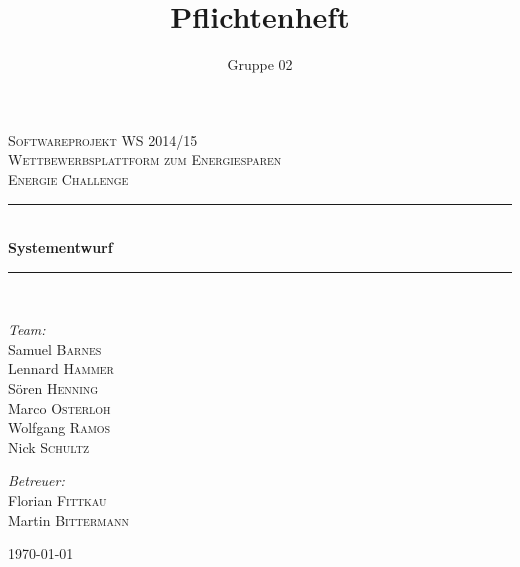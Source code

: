 \documentclass[10pt,a4paper]{article}
\author{Gruppe 02}
\title{Pflichtenheft}
\begin{document}
\begin{titlepage}

\begin{center}



\textsc{\LARGE Softwareprojekt WS 2014/15}\\[1.5cm]

\textsc{\Large Wettbewerbsplattform zum Energiesparen\\[1cm]Energie Challenge}\\[0.5cm]


\newcommand{\HRule}{\rule{\linewidth}{0.5mm}}
\HRule \\[0.4cm]
{ \huge \bfseries Systementwurf}\\[0.4cm]

\HRule \\[1.5cm]

\begin{minipage}{0.4\textwidth}
\begin{flushleft} \large
\emph{Team:}\\
Samuel \textsc{Barnes}\\
Lennard \textsc{Hammer}\\
S\"oren \textsc{Henning}\\
Marco \textsc{Osterloh}\\
Wolfgang \textsc{Ramos}\\
Nick \textsc{Schultz}
\end{flushleft}
\end{minipage}
\hfill
\begin{minipage}{0.4\textwidth}
\begin{flushright} \large
\emph{Betreuer:} \\
Florian \textsc{Fittkau}\\
Martin \textsc{Bittermann}
\end{flushright}
\end{minipage}

\vfill

{\large \today}

\end{center}

\end{titlepage}
\newpage

\tableofcontents
\newpage






\end{document}
